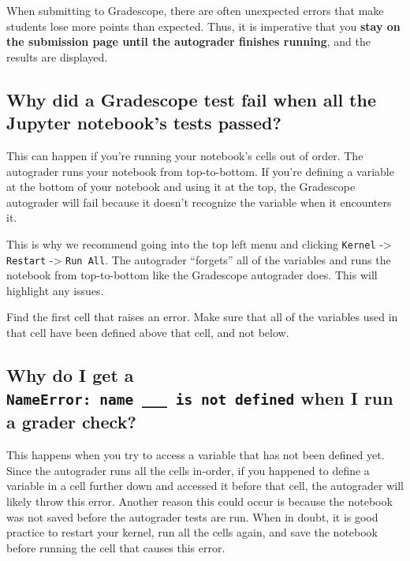 \documentclass[
  letterpaper,
  DIV=11,
  numbers=noendperiod]{scrreprt}
\begin{document}
When submitting to Gradescope, there are often unexpected errors that
make students lose more points than expected. Thus, it is imperative
that you \textbf{stay on the submission page until the autograder
finishes running}, and the results are displayed.

\subsection{Why did a Gradescope test fail when all the Jupyter
notebook's tests
passed?}\label{why-did-a-gradescope-test-fail-when-all-the-jupyter-notebooks-tests-passed}

This can happen if you're running your notebook's cells out of order.
The autograder runs your notebook from top-to-bottom. If you're defining
a variable at the bottom of your notebook and using it at the top, the
Gradescope autograder will fail because it doesn't recognize the
variable when it encounters it.

This is why we recommend going into the top left menu and clicking
\texttt{Kernel} -\textgreater{} \texttt{Restart} -\textgreater{}
\texttt{Run\ All}. The autograder ``forgets'' all of the variables and
runs the notebook from top-to-bottom like the Gradescope autograder
does. This will highlight any issues.

Find the first cell that raises an error. Make sure that all of the
variables used in that cell have been defined above that cell, and not
below.

\subsection{\texorpdfstring{Why do I get a
\texttt{NameError:\ name\ \_\_\_\ is\ not\ defined} when I run a grader
check?}{Why do I get a NameError: name \_\_\_ is not defined when I run a grader check?}}\label{why-do-i-get-a-nameerror-name-___-is-not-defined-when-i-run-a-grader-check}

This happens when you try to access a variable that has not been defined
yet. Since the autograder runs all the cells in-order, if you happened
to define a variable in a cell further down and accessed it before that
cell, the autograder will likely throw this error. Another reason this
could occur is because the notebook was not saved before the autograder
tests are run. When in doubt, it is good practice to restart your
kernel, run all the cells again, and save the notebook before running
the cell that causes this error.
\end{document}
